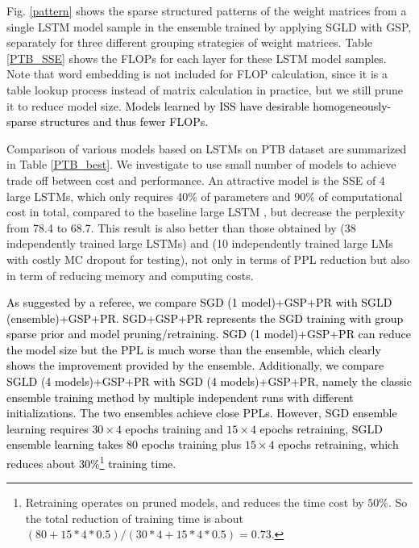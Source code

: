 \documentclass{article} %
\newcommand{\zyc}{\textcolor{black}}
\begin{document}
Fig. \ref{pattern} shows the sparse structured patterns of the weight matrices from a single LSTM model sample in the ensemble trained by applying SGLD with GSP, separately for three different grouping strategies of weight matrices.
Table \ref{PTB_SSE} shows the FLOPs for each layer for these LSTM model samples. 
Note that word embedding is not included for FLOP calculation, since it is a table lookup process instead of matrix calculation in practice, but we still prune it to reduce model size. 
\zyc{Models learned by ISS have desirable homogeneously-sparse structures and thus fewer FLOPs.}

Comparison of various models based on LSTMs on PTB dataset are summarized in Table \ref{PTB_best}.
We investigate to use small number of models to achieve trade off between cost and performance. An attractive model is the SSE of 4 large LSTMs, which only requires 40\% of parameters and 90\% of computational cost in total, compared to the baseline large LSTM \citet{zaremba2014recurrent}, but decrease the perplexity from 78.4 to 68.7. 
This result is also better than those obtained by \citet{zaremba2014recurrent} (38 independently trained large LSTMs) and \citet{gal2016theoretically} (10 independently trained large LMs with costly MC dropout for testing), not only in terms of PPL reduction but also in term of reducing memory and computing costs.

\zyc{
As suggested by a referee, we compare SGD (1 model)+GSP+PR with SGLD (ensemble)+GSP+PR. SGD+GSP+PR represents the SGD training with group sparse prior and model pruning/retraining. 
SGD (1 model)+GSP+PR can reduce the model size but the PPL is much worse than the ensemble, which clearly shows the improvement provided by the ensemble.
Additionally, we compare SGLD (4 models)+GSP+PR with SGD (4 models)+GSP+PR, namely the classic ensemble training method by multiple independent runs with different initializations.
The two ensembles achieve close PPLs. 
However, SGD ensemble learning requires $ 30\times4 $ epochs training and $ 15\times4$ epochs retraining, SGLD ensemble learning takes 80 epochs training plus $ 15\times4$ epochs retraining, which reduces about $30\%$\footnote{Retraining operates on pruned models, and reduces the time cost by $50\%$. So the total reduction of training time is about $(80+15*4*0.5)/(30*4+15*4*0.5)=0.73$. } training time.}
\end{document}
